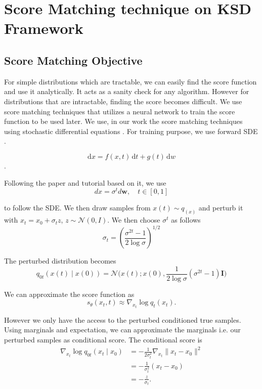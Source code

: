 \documentclass[12pt,a4paper]{report}
\begin{document}
\chapter{Score Matching technique on KSD Framework}
\section{Score Matching Objective}
For simple distributions which are tractable, we can easily find the score function and use it analytically. It acts as a sanity check for any algorithm. However for distributions that are intractable, finding the score becomes difficult. We use score matching techniques that utilizes a neural network to train the score function to be used later. We use, in our work the score matching techniques using stochastic differential equations \cite{song2021scorebasedgenerativemodelingstochastic}. For training purpose, we use forward SDE .

\begin{equation}
\mathrm{d}x = f(x,t)\,\mathrm{d}t + g(t)\,\mathrm{d}w
\end{equation}.

\noindent
Following the paper \cite{song2021scorebasedgenerativemodelingstochastic} and tutorial based on it, we use
\begin{equation}
   d {x} = \sigma^t d\mathbf{w}, \quad t\in[0,1]
\end{equation}

\noindent
to follow the SDE. We then draw samples from $x(t) \sim q_(x)$ and perturb it with $x_t = x_0 + \sigma_t z$, $z \sim \mathcal{N}(0,I)$. We then choose $\sigma^t$ as follows
\begin{equation}
    \sigma_t =
    \left(
        \frac{\sigma^{2t} - 1}{2\log \sigma}
    \right)^{1/2}
\end{equation}

\noindent
The perturbed distribution becomes
\begin{equation}
    q_{0t}({x}(t) \mid {x}(0)) = \mathcal{N}\bigg({x}(t); {x}(0), \frac{1}{2\log \sigma}(\sigma^{2t} - 1) \mathbf{I}\bigg)
\end{equation}

\noindent
We can approximate the score function as
\begin{equation}
s_{\theta}(x_t,t) \approx \nabla_{x_t}\log q_t(x_t).
\label{eq:score_approx}
\end{equation}

\noindent
However we only have the access to the perturbed  conditioned true samples. Using marginals and expectation, we can approximate the marginals i.e. our perturbed samples as conditional score. The conditional score is
\begin{align}
\nabla_{x_t}\log q_{0t}(x_t\mid x_0)
&=
-\frac{1}{2\sigma_t^2}
\nabla_{x_t}\|x_t-x_0\|^2 \\
&=
-\frac{1}{\sigma_t^2}(x_t-x_0)\\
&=
-\frac{z}{\sigma_t}.
\label{eq:denoise_score}
\end{align}
\end{document}
